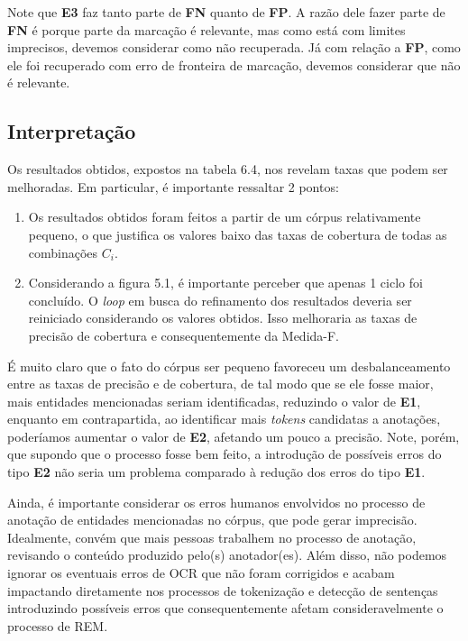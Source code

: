 \documentclass[11pt]{report}
\begin{document}
Note que \textbf{E3} faz tanto parte de \textbf{FN} quanto de \textbf{FP}. A razão dele fazer parte de \textbf{FN} é porque parte da marcação é relevante, mas como está com limites imprecisos, devemos considerar como não recuperada. Já com relação a \textbf{FP}, como ele foi recuperado com erro de fronteira de marcação, devemos considerar que não é relevante.

\subsection{Interpretação}

\indent\indent Os resultados obtidos, expostos na tabela 6.4, nos revelam taxas que podem ser melhoradas. Em particular, é importante ressaltar 2 pontos:

\begin{enumerate}[label={\textbf{\arabic*.}}]
\item Os resultados obtidos foram feitos a partir de um córpus relativamente pequeno, o que justifica os valores baixo das taxas de cobertura de todas as combinações $C_i$.
\item Considerando a figura 5.1, é importante perceber que apenas 1 ciclo foi concluído. O \textit{loop} em busca do refinamento dos resultados deveria ser reiniciado considerando os
valores obtidos. Isso melhoraria as taxas de precisão de cobertura e consequentemente da Medida-F.
\end{enumerate}

É muito claro que o fato do córpus ser pequeno favoreceu um desbalanceamento entre as taxas de precisão e de cobertura, de tal modo que se ele fosse maior, mais entidades mencionadas
seriam identificadas, reduzindo o valor de \textbf{E1}, enquanto em contrapartida, ao identificar mais \textit{tokens} candidatas a anotações, poderíamos aumentar o valor de \textbf{E2}, afetando um pouco a precisão. Note, porém, que supondo que o processo fosse bem feito, a introdução de possíveis erros do tipo \textbf{E2} não seria um problema comparado à redução dos
erros do tipo \textbf{E1}.

Ainda, é importante considerar os erros humanos envolvidos no processo de anotação de entidades mencionadas no córpus, que pode gerar imprecisão. Idealmente, convém que mais
pessoas trabalhem no processo de anotação, revisando o conteúdo produzido pelo(s) anotador(es). Além disso, não podemos ignorar os eventuais erros de OCR que não foram corrigidos
e acabam impactando diretamente nos processos de tokenização e detecção de sentenças introduzindo possíveis erros que consequentemente afetam consideravelmente o processo de REM.
\end{document}
